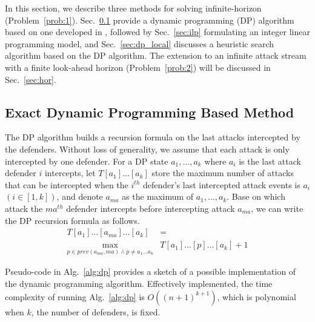 In this section, we describe three methods for solving infinite-horizon \prob (Problem~\ref{prob:1}).
Sec.~\ref{sec:dp} provide a dynamic programming (DP) algorithm based on one developed in \cite{adler2022role}, 
followed by Sec.~\ref{sec:ilp} formulating an integer linear programming model,
and Sec.~\ref{sec:dp_local} discusses a heuristic search algorithm based on the DP algorithm. 
The extension to an infinite attack stream with a finite look-ahead horizon  (Problem~\ref{prob:2}) will be discussed in Sec.~\ref{sec:hor}.


\subsection{Exact Dynamic Programming Based Method}%
\label{sec:dp}

The DP algorithm builds a recursion formula on the last attacks intercepted by the defenders.
Without loss of generality, we assume that each attack is only intercepted by one defender.
For a DP state $a_1, \dots, a_k$ where $a_i$ is the last attack defender $i$ intercepts, 
let $T[a_1]\dots[a_k]$ store the maximum number of attacks that can be intercepted when the $i^{th}$ defender's last intercepted attack events is $a_i$ $(i\in[1,k])$,
and denote $a_{ma}$ as the maximum of $a_1, \dots, a_k$.
Base on which attack the $ma^{th}$ defender intercepts before intercepting attack $a_{ma}$,
we can write the DP recursion formula as follows.
\begin{equation}
\begin{split}
T[a_1]\dots[a_{ma}]\dots[a_k] &= \\ 
\max_{p\in prev(a_{ma}, ma) \wedge p\neq a_1 \dots a_k} &  T[a_1]\dots[p]\dots[a_k] + 1
\end{split}
\end{equation}

Pseudo-code in Alg.~\ref{alg:dp} provides a sketch of a possible implementation of the dynamic programming algorithm.
Effectively implemented, the time complexity of running Alg.~\ref{alg:dp} is $O( (n+1)^{k+1})$, which is polynomial when $k$, the number of defenders, is fixed.
\vspace{-2mm}

